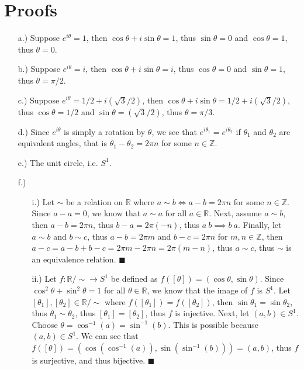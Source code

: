 \documentclass[12pt]{article}
\newcommand{\parens}[1]{\left(#1\right)}             %
\newcommand{\Z}{\mathbb{Z}}
\newcommand{\R}{\mathbb{R}}
\begin{document}
\section*{Proofs}
\begin{itemize}
    \item [a.)] Suppose $e^{i\theta}=1$, then $\cos\theta+i\sin\theta=1$, thus $\sin\theta=0$ and $\cos\theta=1$, thus $\theta=0$.

    \item [b.)] Suppose $e^{i\theta}=i$, then $\cos\theta+i\sin\theta=i$, thus $\cos\theta=0$ and $\sin\theta=1$, thus $\theta=\pi/2$.

    \item [c.)] Suppose $e^{i\theta}=1/2+i\parens{\sqrt3/2}$, then $\cos\theta+i\sin\theta=1/2+i\parens{\sqrt3/2}$, thus $\cos\theta=1/2$ and $\sin\theta=\parens{\sqrt3/2}$, thus $\theta=\pi/3$.

    \item [d.)] Since $e^{i\theta}$ is simply a rotation by $\theta$, we see that $e^{i\theta_1}=e^{i\theta_2}$ if $\theta_1$ and $\theta_2$ are equivalent angles, that is $\theta_1-\theta_2=2\pi n$ for some $n\in\Z$.
    
    \item [e.)] The unit circle, i.e. $S^1$.

    \pagebreak
    \item [f.)] \begin{itemize}
        \item [i.)] Let $\sim$ be a relation on $\R$ where $a\sim b\iff a-b=2\pi n$ for some $n\in\Z$. Since $a-a=0$, we know that $a\sim a$ for all $a\in\R$. Next, assume $a\sim b$, then $a-b=2\pi n$, thus $b-a=2\pi(-n)$, thus $a~b\implies b~a$. Finally, let $a\sim b$ and $b\sim c$, thus $a-b=2\pi m$ and $b-c=2\pi n$ for $m,n\in\Z$, then $a-c=a-b+b-c=2\pi m-2\pi n=2\pi(m-n)$, thus $a\sim c$, thus $\sim$ is an equivalence relation. $\blacksquare$

        \item [ii.)] Let $f:\R/{\sim}\to S^1$ be defined as $f([\theta])=(\cos\theta,\sin\theta)$. Since $\cos^2\theta+\sin^2\theta=1$ for all $\theta\in\R$, we know that the image of $f$ is $S^1$. Let $[\theta_1],[\theta_2]\in\R/{\sim}$ where $f([\theta_1])=f([\theta_2])$, then $\sin\theta_1=\sin\theta_2$, thus $\theta_1\sim\theta_2$, thus $[\theta_1]=[\theta_2]$, thus $f$ is injective. Next, let $(a,b)\in S^1$. Choose $\theta=\cos^{-1}(a)=\sin^{-1}(b)$. This is possible because $(a,b)\in S^1$. We can see that $f([\theta])=(\cos(\cos^{-1}(a)),\sin(\sin^{-1}(b)))=(a,b)$, thus $f$ is surjective, and thus bijective. $\blacksquare$
    \end{itemize}
\end{itemize}
\end{document}
